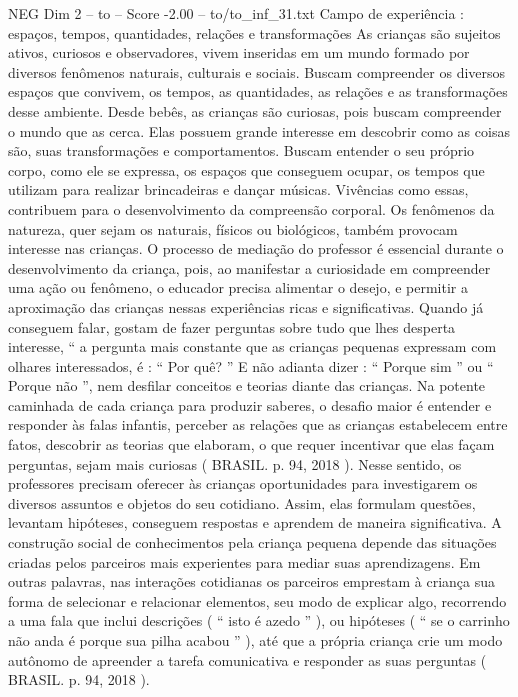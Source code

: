 \begin{textsample}{NEG Dim 2 – to – Score -2.00 – to/to\_inf\_31.txt}  \label{ex:f2_neg_159}
Campo de experiência : espaços, tempos, quantidades, relações e transformações As crianças são sujeitos ativos, curiosos e observadores, vivem inseridas em um mundo formado por diversos fenômenos naturais, culturais e sociais.
Buscam compreender os diversos espaços que convivem, os tempos, as quantidades, as relações e as transformações desse ambiente.
Desde bebês, as crianças são curiosas, pois buscam compreender o mundo que as cerca.
Elas possuem grande interesse em descobrir como as coisas são, suas transformações e comportamentos.
Buscam entender o seu próprio corpo, como ele se expressa, os espaços que conseguem ocupar, os tempos que utilizam para realizar brincadeiras e dançar músicas.
Vivências como essas, contribuem para o desenvolvimento da compreensão corporal.
Os fenômenos da natureza, quer sejam os naturais, físicos ou biológicos, também provocam interesse nas crianças.
O processo de mediação do professor é essencial durante o desenvolvimento da criança, pois, ao manifestar a curiosidade em compreender uma ação ou fenômeno, o educador precisa alimentar o desejo, e permitir a aproximação das crianças nessas experiências ricas e significativas.
Quando já conseguem falar, gostam de fazer perguntas sobre tudo que lhes desperta interesse, “ a pergunta mais constante que as crianças pequenas expressam com olhares interessados, é : “ Por quê? ” E não adianta dizer : “ Porque sim ” ou “ Porque não ”, nem desfilar conceitos e teorias diante das crianças.
Na potente caminhada de cada criança para produzir saberes, o desafio maior é entender e responder às falas infantis, perceber as relações que as crianças estabelecem entre fatos, descobrir as teorias que elaboram, o que requer incentivar que elas façam perguntas, sejam mais curiosas ( BRASIL. p. 94, 2018 ).
Nesse sentido, os professores precisam oferecer às crianças oportunidades para investigarem os diversos assuntos e objetos do seu cotidiano.
Assim, elas formulam questões, levantam hipóteses, conseguem respostas e aprendem de maneira significativa.
A construção social de conhecimentos pela criança pequena depende das situações criadas pelos parceiros mais experientes para mediar suas aprendizagens.
Em outras palavras, nas interações cotidianas os parceiros emprestam à criança sua forma de selecionar e relacionar elementos, seu modo de explicar algo, recorrendo a uma fala que inclui descrições ( “ isto é azedo ” ), ou hipóteses ( “ se o carrinho não anda é porque sua pilha acabou ” ), até que a própria criança crie um modo autônomo de apreender a tarefa comunicativa e responder as suas perguntas ( BRASIL. p. 94, 2018 ).

\end{textsample}
